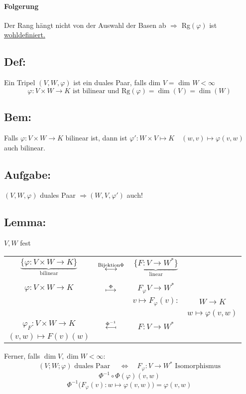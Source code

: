 \documentclass[titlepage,12pt,a4paper,ngerman]{report}
\newcommand{\tx}[1]{\textrm{#1}}
\newcommand{\ub}[1]{\underbrace{#1}}
\begin{document}
\paragraph{Folgerung}
Der Rang hängt nicht von der Auswahl der Basen ab $\Rightarrow$ Rg$(\varphi)$ ist \underline{wohldefiniert.}

\subsection{Def:}
Ein Tripel $(V,W,\varphi)$ ist ein duales Paar, falls dim $V =$ dim $W < \infty $
$$\varphi: V \times W \to K \tx{ ist bilinear und Rg}(\varphi) = \dim (V) = \dim (W)$$


\subsection*{Bem:} Falls $ \varphi: V \times W \to K $ bilinear ist, dann ist $ \varphi': W \times V \mapsto K \quad (w,v) \mapsto \varphi(v,w)$ auch bilinear.
\subsection*{Aufgabe:}
$ (V,W,\varphi) $ duales Paar $ \Rightarrow (W,V,\varphi') $ auch!
\subsection{Lemma:} $ V,W $ fest
\begin{center}
	\begin{tabular}{cccc}
		$ \ub{\{\varphi: V\times W \to K \}}_{\tx{bilinear}} $ & $ \buildrel \tx{Bijektion} \Phi \over \longleftrightarrow$ & $ \ub{\{F: V \to W^*\}}_{\tx{linear}} $ & $  $\\
		\\
		$ \varphi: V \times W \to K $ & $ \buildrel \Phi \over \longmapsto $ & $ F_\varphi V \to W^* $ & $  $\\
		$  $ & $  $ & $ v \mapsto F_\varphi (v) : $ & $ W \to K $\\
		$  $ & $  $ & $  $ & $ w \mapsto \varphi(v,w) $\\
		$ \varphi_F : V \times W \to K $ & $ \buildrel \Phi ^{-1} \over{\reflectbox{$\longmapsto$}}$ & $ F: V \to W^* $ & $  $\\
		$ (v,w) \mapsto F(v)(w) $ & $  $ & $  $ & $  $\\
	\end{tabular}
\end{center}
Ferner, falls $ \dim V, \dim W < \infty $:\\
$$ (V;W;\varphi) \tx{ duales Paar } \quad \Leftrightarrow \quad F_\varphi : V \to W^* \tx{ Isomorphismus}$$
$$\Phi^{-1} \circ \Phi (\varphi)(v,w)$$
$$\Phi^{-1}\bigg(F_\varphi(v):w\mapsto\varphi(v,w)\bigg) = \varphi(v,w)$$   
\end{document}
